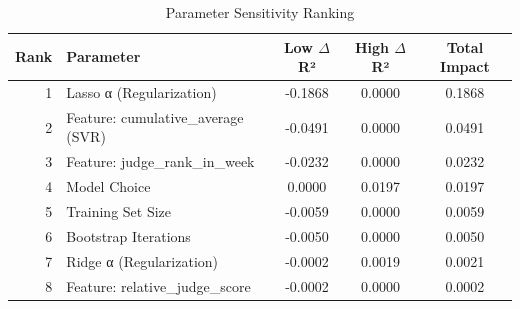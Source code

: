 
\begin{table}[h]
\centering
\caption{Parameter Sensitivity Ranking}
\label{tab:param_impact}
\begin{tabular}{r l c c c}
\toprule
\textbf{Rank} & \textbf{Parameter} & \textbf{Low $\Delta$R²} & \textbf{High $\Delta$R²} & \textbf{Total Impact} \\
\midrule
1 & Lasso α (Regularization) & -0.1868 & 0.0000 & 0.1868 \\
2 & Feature: cumulative_average (SVR) & -0.0491 & 0.0000 & 0.0491 \\
3 & Feature: judge_rank_in_week & -0.0232 & 0.0000 & 0.0232 \\
4 & Model Choice & 0.0000 & 0.0197 & 0.0197 \\
5 & Training Set Size & -0.0059 & 0.0000 & 0.0059 \\
6 & Bootstrap Iterations & -0.0050 & 0.0000 & 0.0050 \\
7 & Ridge α (Regularization) & -0.0002 & 0.0019 & 0.0021 \\
8 & Feature: relative_judge_score & -0.0002 & 0.0000 & 0.0002 \\
\bottomrule
\end{tabular}
\end{table}
